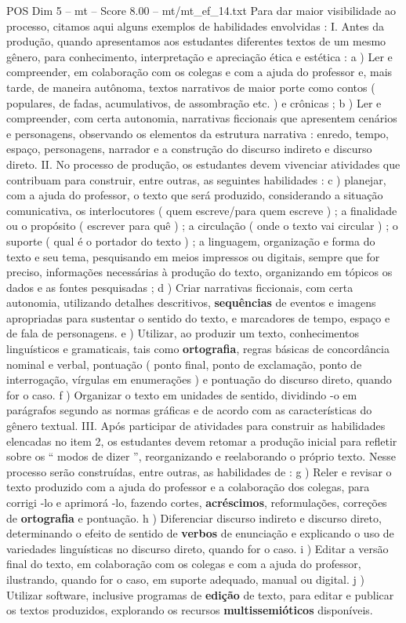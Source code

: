 \begin{textsample}{POS Dim 5 – mt – Score 8.00 – mt/mt\_ef\_14.txt}
Para dar maior visibilidade ao processo, citamos aqui alguns exemplos de habilidades envolvidas : I.
Antes da produção, quando apresentamos aos estudantes diferentes textos de um mesmo gênero, para conhecimento, interpretação e apreciação ética e estética : a ) Ler e compreender, em colaboração com os colegas e com a ajuda do professor e, mais tarde, de maneira autônoma, textos narrativos de maior porte como contos ( populares, de fadas, acumulativos, de assombração etc. ) e crônicas ; b ) Ler e compreender, com certa autonomia, narrativas ficcionais que apresentem cenários e personagens, observando os elementos da estrutura narrativa : enredo, tempo, espaço, personagens, narrador e a construção do discurso indireto e discurso direto.
II.
No processo de produção, os estudantes devem vivenciar atividades que contribuam para construir, entre outras, as seguintes habilidades : c ) planejar, com a ajuda do professor, o texto que será produzido, considerando a situação comunicativa, os interlocutores ( quem escreve/para quem escreve ) ; a finalidade ou o propósito ( escrever para quê ) ; a circulação ( onde o texto vai circular ) ; o suporte ( qual é o portador do texto ) ; a linguagem, organização e forma do texto e seu tema, pesquisando em meios impressos ou digitais, sempre que for preciso, informações necessárias à produção do texto, organizando em tópicos os dados e as fontes pesquisadas ; d ) Criar narrativas ficcionais, com certa autonomia, utilizando detalhes descritivos, \textbf{sequências} de eventos e imagens apropriadas para sustentar o sentido do texto, e marcadores de tempo, espaço e de fala de personagens. e ) Utilizar, ao produzir um texto, conhecimentos linguísticos e gramaticais, tais como \textbf{ortografia}, regras básicas de concordância nominal e verbal, pontuação ( ponto final, ponto de exclamação, ponto de interrogação, vírgulas em enumerações ) e pontuação do discurso direto, quando for o caso. f ) Organizar o texto em unidades de sentido, dividindo -o em parágrafos segundo as normas gráficas e de acordo com as características do gênero textual.
III.
Após participar de atividades para construir as habilidades elencadas no item 2, os estudantes devem retomar a produção inicial para refletir sobre os “ modos de dizer ”, reorganizando e reelaborando o próprio texto.
Nesse processo serão construídas, entre outras, as habilidades de : g ) Reler e revisar o texto produzido com a ajuda do professor e a colaboração dos colegas, para corrigi -lo e aprimorá -lo, fazendo cortes, \textbf{acréscimos}, reformulações, correções de \textbf{ortografia} e pontuação. h ) Diferenciar discurso indireto e discurso direto, determinando o efeito de sentido de \textbf{verbos} de enunciação e explicando o uso de variedades linguísticas no discurso direto, quando for o caso. i ) Editar a versão final do texto, em colaboração com os colegas e com a ajuda do professor, ilustrando, quando for o caso, em suporte adequado, manual ou digital. j ) Utilizar software, inclusive programas de \textbf{edição} de texto, para editar e publicar os textos produzidos, explorando os recursos \textbf{multissemióticos} disponíveis.

\end{textsample}
